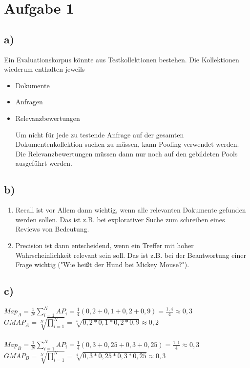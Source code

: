 \section*{Aufgabe 1}

\subsection*{a)}
Ein Evaluationskorpus könnte aus Testkollektionen bestehen. Die Kollektionen wiederum enthalten jeweils 
\begin{itemize}
\item Dokumente
\item Anfragen
\item Relevanzbewertungen

Um nicht für jede zu testende Anfrage auf der gesamten Dokumentenkollektion suchen zu müssen, kann Pooling verwendet werden. Die Relevanzbewertungen müssen dann nur noch auf den gebildeten Pools ausgeführt werden.
\end{itemize}

\subsection*{b)}
\begin{enumerate}
\item Recall ist vor Allem dann wichtig, wenn alle relevanten Dokumente gefunden werden sollen. Das ist z.B. bei explorativer Suche zum schreiben eines Reviews von Bedeutung. 
\item Precision ist dann entscheidend, wenn ein Treffer mit hoher Wahrscheinlichkeit relevant sein soll. Das ist z.B. bei der Beantwortung einer Frage wichtig ("Wie heißt der Hund bei Mickey Mouse?"). 
\end{enumerate}

\subsection*{c)}

$Map_{A} = \frac{1}{N} \sum_{i=1}^{N} AP_{i} = \frac{1}{4} (0,2 + 0,1 + 0,2 + 0,9) = \frac{1,4}{4} \approx 0,3$ \\
$GMAP_{A} = \sqrt[N]{\prod_{i=1}^{N}} = \sqrt[4]{0,2 * 0,1 * 0,2 * 0,9} \approx 0,2$\\
\ \\
$Map_{B} = \frac{1}{N} \sum_{i=1}^{N} AP_{i} = \frac{1}{4} (0,3 + 0,25 + 0,3 + 0,25) = \frac{1,1}{4} \approx 0,3 $\\
$GMAP_{B} = \sqrt[N]{\prod_{i=1}^{N}} = \sqrt[4]{0,3 * 0,25 * 0,3 * 0,25} \approx 0,3$\\
